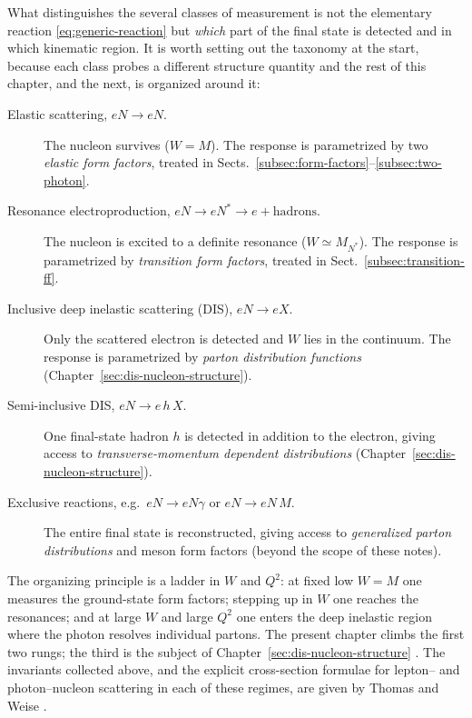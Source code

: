What distinguishes the several classes of measurement is not the elementary reaction
\eqref{eq:generic-reaction} but \emph{which} part of the final state is detected and
in which kinematic region. It is worth setting out the taxonomy at the start, because
each class probes a different structure quantity and the rest of this chapter, and the
next, is organized around it:
\begin{description}
    \item[Elastic scattering, $eN\to eN$.] The nucleon survives ($W=M$). The response
        is parametrized by two \emph{elastic form factors}, treated in
        Sects.~\ref{subsec:form-factors}--\ref{subsec:two-photon}.
    \item[Resonance electroproduction, $eN\to eN^{*}\to e+\text{hadrons}$.] The nucleon
        is excited to a definite resonance ($W\simeq M_{N^{*}}$). The response is
        parametrized by \emph{transition form factors}, treated in
        Sect.~\ref{subsec:transition-ff}.
    \item[Inclusive deep inelastic scattering (DIS), $eN\to eX$.] Only the scattered
        electron is detected and $W$ lies in the continuum. The response is
        parametrized by \emph{parton distribution functions}
        (Chapter~\ref{sec:dis-nucleon-structure}).
    \item[Semi-inclusive DIS, $eN\to e\,h\,X$.] One final-state hadron $h$ is detected
        in addition to the electron, giving access to \emph{transverse-momentum
        dependent distributions} (Chapter~\ref{sec:dis-nucleon-structure}).
    \item[Exclusive reactions, e.g.\ $eN\to eN\gamma$ or $eN\to eN\,M$.] The entire
        final state is reconstructed, giving access to \emph{generalized parton
        distributions} and meson form factors (beyond the scope of these notes).
\end{description}
The organizing principle is a ladder in $W$ and $Q^{2}$: at fixed low $W=M$ one measures
the ground-state form factors; stepping up in $W$ one reaches the resonances; and at
large $W$ and large $Q^{2}$ one enters the deep inelastic region where the photon
resolves individual partons. The present chapter climbs the first two rungs; the third
is the subject of Chapter~\ref{sec:dis-nucleon-structure} \cite[Ch.~1]{Amsler2018}.
The invariants collected above, and the explicit cross-section formulae for lepton-- and
photon--nucleon scattering in each of these regimes, are given by Thomas and Weise
\cite[Ch.~2.1, App.~B]{ThomasWeise2001}.

